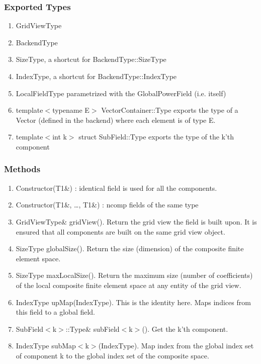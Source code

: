 \documentclass[11pt,a4paper,DIV11,%
notitlepage,oneside,abstracton,%
bibtotoc]{scrartcl}
\begin{document}
\subsubsection{Exported Types}

\begin{enumerate}[1)]
\item GridViewType 
\item BackendType
\item SizeType, a shortcut for BackendType::SizeType
\item IndexType, a shortcut for BackendType::IndexType
\item LocalFieldType parametrized with the GlobalPowerField (i.e. itself)
\item template$<$typename E$>$ VectorContainer::Type exports the type of a Vector
  (defined in the backend) where each element is of type E.
\item template$<$int k$>$ struct SubField::Type exports the type of
  the k'th component
\end{enumerate}

\subsubsection{Methods}

\begin{enumerate}[1)]
\item Constructor(T1\&) : identical field is used for all the components. 
\item Constructor(T1\&, \ldots , T1\&) : ncomp fields of the same type
\item GridViewType\& gridView(). Return the grid view 
  the field is built upon. It is ensured that all components are built
  on the same grid view object.
\item SizeType globalSize(). Return the size (dimension) of the
  composite finite element space.  
\item SizeType maxLocalSize(). Return the maximum size (number of
  coefficients) of the local composite finite element space at any entity of the
  grid view.
\item IndexType upMap(IndexType). This is the identity here. Maps
  indices from this field to a global field.
\item SubField$<$k$>$::Type\& subField$<$k$>$(). Get the k'th component.
\item IndexType subMap$<$k$>$(IndexType). Map index from the global
  index set of component k to the global index set of the composite space.
\end{enumerate}
\end{document}
